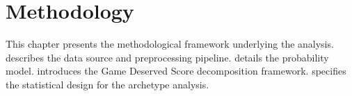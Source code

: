 \chapter{Methodology}
\label{ch:methodology}

This chapter presents the methodological framework underlying the analysis.  describes the data source and preprocessing pipeline.  details the \xscore{} probability model.  introduces the Game Deserved Score decomposition framework.  specifies the statistical design for the archetype analysis.






